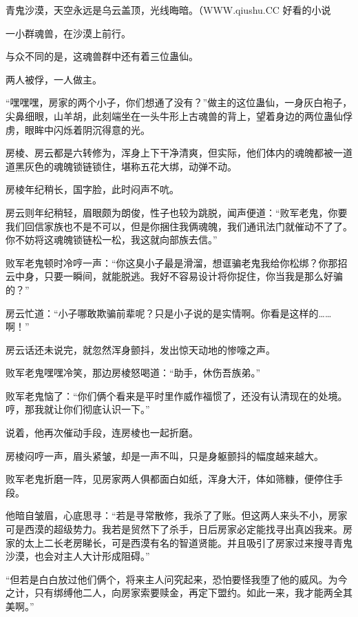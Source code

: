 
\begin{this_body}

青鬼沙漠，天空永远是乌云盖顶，光线晦暗。（WWW.qiushu.CC 好看的小说

一小群魂兽，在沙漠上前行。

与众不同的是，这魂兽群中还有着三位蛊仙。

两人被俘，一人做主。

“嘿嘿嘿，房家的两个小子，你们想通了没有？”做主的这位蛊仙，一身灰白袍子，尖鼻细眼，山羊胡，此刻端坐在一头牛形上古魂兽的背上，望着身边的两位蛊仙俘虏，眼眸中闪烁着阴沉得意的光。

房棱、房云都是六转修为，浑身上下干净清爽，但实际，他们体内的魂魄都被一道道黑灰色的魂魄锁链锁住，堪称五花大绑，动弹不动。

房棱年纪稍长，国字脸，此时闷声不吭。

房云则年纪稍轻，眉眼颇为朗俊，性子也较为跳脱，闻声便道：“败军老鬼，你要我们回信家族也不是不可以，但是你捆住我俩魂魄，我们通讯法门就催动不了了。你不妨将这魂魄锁链松一松，我这就向部族去信。”

败军老鬼顿时冷哼一声：“你这臭小子最是滑溜，想诓骗老鬼我给你松绑？你那招云中身，只要一瞬间，就能脱逃。我好不容易设计将你捉住，你当我是那么好骗的？”

房云忙道：“小子哪敢欺骗前辈呢？只是小子说的是实情啊。你看是这样的……啊！”

房云话还未说完，就忽然浑身颤抖，发出惊天动地的惨嚎之声。

败军老鬼嘿嘿冷笑，那边房棱怒喝道：“助手，休伤吾族弟。”

败军老鬼恼了：“你们俩个看来是平时里作威作福惯了，还没有认清现在的处境。哼，那我就让你们彻底认识一下。”

说着，他再次催动手段，连房棱也一起折磨。

房棱闷哼一声，眉头紧皱，却是一声不叫，只是身躯颤抖的幅度越来越大。

败军老鬼折磨一阵，见房家两人俱都面白如纸，浑身大汗，体如筛糠，便停住手段。

他暗自皱眉，心底思寻：“若是寻常散修，我杀了了账。但这两人来头不小，房家可是西漠的超级势力。我若是贸然下了杀手，日后房家必定能找寻出真凶我来。房家的太上二长老房睇长，可是西漠有名的智道贤能。并且吸引了房家过来搜寻青鬼沙漠，也会对主人大计形成阻碍。”

“但若是白白放过他们俩个，将来主人问究起来，恐怕要怪我堕了他的威风。为今之计，只有绑缚他二人，向房家索要赎金，再定下盟约。如此一来，我才能两全其美啊。”


\end{this_body}
